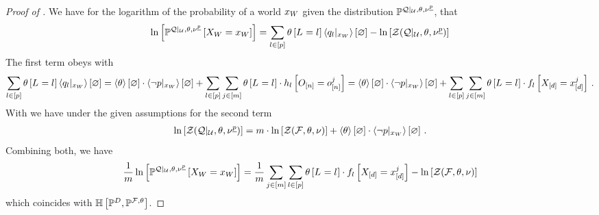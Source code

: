 \begin{proof}[Proof of ]
    We have for the logarithm of the probability of a world $x_{W}$ given the distribution $\mathbb{P}^{{\mathcal{Q}}|_{\mathcal{U}},\theta,\nu^{\underline{p}}}$, that
    \begin{align*}
        \ln \left[ \mathbb{P}^{{\mathcal{Q}}|_{\mathcal{U}},\theta,\nu^{\underline{p}}}\left[X_{W}=x_{W}\right] \right]
        =  \sum_{l\in[p]} \theta\left[L_{}=l_{}\right] \left\langle {q_{l}}|_{x_{W}}\right\rangle \left[ \varnothing \right] - \ln \left[ \mathcal{Z}{\left({\mathcal{Q}}|_{\mathcal{U}},\theta,\nu^{\underline{p}}\right)} \right]
    \end{align*}
    The first term obeys with 
    \begin{align*}
        \sum_{l\in[p]} \theta\left[L_{}=l_{}\right] \left\langle {q_{l}}|_{x_{W}}\right\rangle \left[ \varnothing \right]
        =  \left\langle \theta\right\rangle \left[ \varnothing \right] \cdot \left\langle {\lnot p}|_{x_{W}}\right\rangle \left[ \varnothing \right]
        + \sum_{l\in[p]}\sum_{j\in[m]} \theta\left[L_{}=l_{}\right] \cdot h_{l}\left[O_{[n]}=o_{[n]}^{j}\right]
        = \left\langle \theta\right\rangle \left[ \varnothing \right] \cdot \left\langle {\lnot p}|_{x_{W}}\right\rangle \left[ \varnothing \right]
        + \sum_{l\in[p]}\sum_{j\in[m]} \theta\left[L_{}=l_{}\right] \cdot f_{l}\left[X_{[d]}=x_{[d]}^{j}\right] \, .
    \end{align*}
    With  we have under the given assumptions for the second term
    \begin{align*}
        \ln \left[ \mathcal{Z}{\left({\mathcal{Q}}|_{\mathcal{U}},\theta,\nu^{\underline{p}}\right)} \right] = m \cdot \ln \left[ \mathcal{Z}{\left(\mathcal{F},\theta,\nu\right)} \right]  + \left\langle \theta\right\rangle \left[ \varnothing \right] \cdot \left\langle {\lnot p}|_{x_{W}}\right\rangle \left[ \varnothing \right] \, .
    \end{align*}
    Combining both, we have
    \begin{align*}
        \frac{1}{m} \ln \left[ \mathbb{P}^{{\mathcal{Q}}|_{\mathcal{U}},\theta,\nu^{\underline{p}}}\left[X_{W}=x_{W}\right] \right]
        =  \frac{1}{m}\sum_{j\in[m]}\sum_{l\in[p]} \theta\left[L_{}=l_{}\right] \cdot f_{l}\left[X_{[d]}=x_{[d]}^{j}\right]  - \ln \left[ \mathcal{Z}{\left(\mathcal{F},\theta,\nu\right)} \right]
    \end{align*}
    which coincides with $\mathbb{H}\left[\mathbb{P}^{D},\mathbb{P}^{\mathcal{F},\theta}\right]$.
\end{proof}

